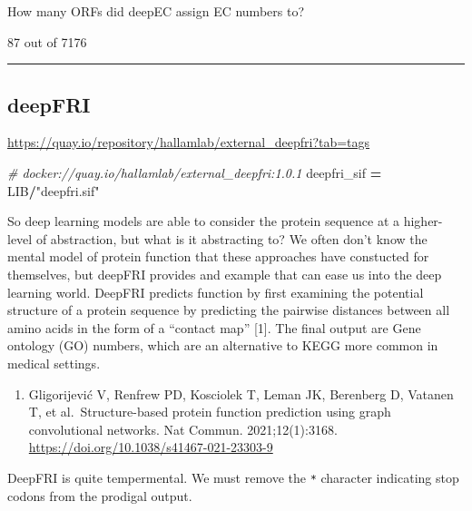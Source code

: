 \documentclass[
]{book}
\newenvironment{Shaded}{\begin{snugshade}}{\end{snugshade}}
\newcommand{\CommentTok}[1]{\textcolor[rgb]{0.56,0.35,0.01}{\textit{#1}}}
\newcommand{\NormalTok}[1]{#1}
\newcommand{\OperatorTok}[1]{\textcolor[rgb]{0.81,0.36,0.00}{\textbf{#1}}}
\newcommand{\StringTok}[1]{\textcolor[rgb]{0.31,0.60,0.02}{#1}}
\providecommand{\tightlist}{%
  \setlength{\itemsep}{0pt}\setlength{\parskip}{0pt}}
\begin{document}
How many ORFs did deepEC assign EC numbers to?

87 out of 7176

\begin{center}\rule{0.5\linewidth}{0.5pt}\end{center}

\subsection{deepFRI}\label{deepfri}

\url{https://quay.io/repository/hallamlab/external_deepfri?tab=tags}

\begin{Shaded}
\begin{Highlighting}[numbers=left,,]
\CommentTok{\# docker://quay.io/hallamlab/external\_deepfri:1.0.1}
\NormalTok{deepfri\_sif }\OperatorTok{=}\NormalTok{ LIB}\OperatorTok{/}\StringTok{"deepfri.sif"}
\end{Highlighting}
\end{Shaded}

So deep learning models are able to consider the protein sequence at a higher-level of abstraction, but what is it abstracting to?
We often don't know the mental model of protein function that these approaches have constucted for themselves, but deepFRI provides
and example that can ease us into the deep learning world. DeepFRI predicts function by first examining the potential structure
of a protein sequence by predicting the pairwise distances between all amino acids in the form of a ``contact map'' {[}1{]}. The final output
are Gene ontology (GO) numbers, which are an alternative to KEGG more common in medical settings.

\begin{enumerate}
\def\labelenumi{\arabic{enumi}.}
\tightlist
\item
  Gligorijević V, Renfrew PD, Kosciolek T, Leman JK, Berenberg D, Vatanen T, et al.~Structure-based protein function prediction using graph convolutional networks. Nat Commun. 2021;12(1):3168. \url{https://doi.org/10.1038/s41467-021-23303-9}
\end{enumerate}

DeepFRI is quite tempermental. We must remove the \texttt{*} character indicating stop codons from the prodigal output.
\end{document}
